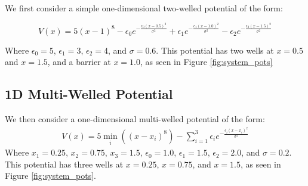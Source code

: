 \documentclass{article}
\begin{document}
We first consider a simple one-dimensional two-welled potential of the form:

$$
V(x) = 5(x-1)^8 - \epsilon_0 e^{-\frac{\epsilon_0(x-0.5)^2}{\sigma^2}} + \epsilon_1 e^{-\frac{\epsilon_1(x-1.0)^2}{\sigma^2}} - \epsilon_2 e^{-\frac{\epsilon_2(x-1.5)^2}{\sigma^2}}
$$

Where $\epsilon_0 = 5$, $\epsilon_1 = 3$, $\epsilon_2 = 4$, and $\sigma = 0.6$. 
This potential has two wells at $x = 0.5$ and $x = 1.5$, and a barrier at $x = 1.0$, as seen in Figure \ref{fig:system_pots}

\subsection{1D Multi-Welled Potential}

We then consider a one-dimensional multi-welled potential of the form:
\begin{align*}
    V(x) = 5 \min_{i} \left((x - x_i)^8\right) - \sum_  {i=1}^{3} \epsilon_i e^{-\frac{\epsilon_i(x-x_i)^2}{\sigma^2}}
\end{align*}
Where $x_1 = 0.25$, $x_2 = 0.75$, $x_3 = 1.5$, $\epsilon_0 = 1.0$, $\epsilon_1 = 1.5$, $\epsilon_2 = 2.0$, and $\sigma = 0.2$. This potential has three wells at $x = 0.25$, $x = 0.75$, and $x = 1.5$, as seen in Figure \ref{fig:system_pots}.





\end{document}
